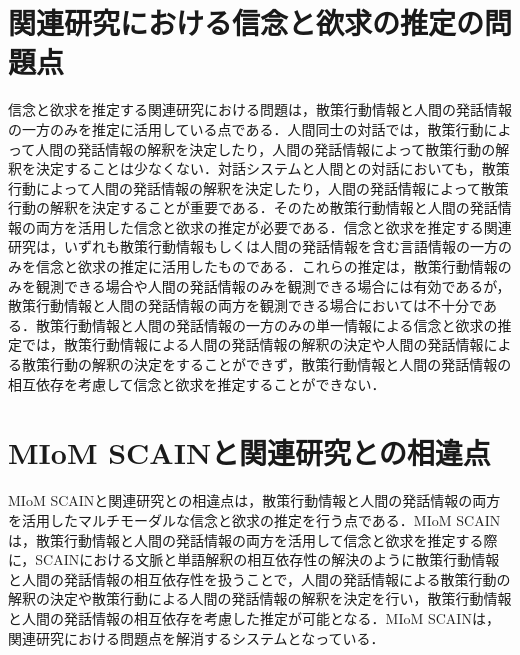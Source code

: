 \section{関連研究における信念と欲求の推定の問題点}
\par
信念と欲求を推定する関連研究における問題は，散策行動情報と人間の発話情報の一方のみを推定に活用している点である．人間同士の対話では，散策行動によって人間の発話情報の解釈を決定したり，人間の発話情報によって散策行動の解釈を決定することは少なくない．対話システムと人間との対話においても，散策行動によって人間の発話情報の解釈を決定したり，人間の発話情報によって散策行動の解釈を決定することが重要である．そのため散策行動情報と人間の発話情報の両方を活用した信念と欲求の推定が必要である．信念と欲求を推定する関連研究は，いずれも散策行動情報もしくは人間の発話情報を含む言語情報の一方のみを信念と欲求の推定に活用したものである．これらの推定は，散策行動情報のみを観測できる場合や人間の発話情報のみを観測できる場合には有効であるが，散策行動情報と人間の発話情報の両方を観測できる場合においては不十分である．散策行動情報と人間の発話情報の一方のみの単一情報による信念と欲求の推定では，散策行動情報による人間の発話情報の解釈の決定や人間の発話情報による散策行動の解釈の決定をすることができず，散策行動情報と人間の発話情報の相互依存を考慮して信念と欲求を推定することができない．


\section{MIoM SCAINと関連研究との相違点}
\par
MIoM SCAINと関連研究との相違点は，散策行動情報と人間の発話情報の両方を活用したマルチモーダルな信念と欲求の推定を行う点である．MIoM SCAINは，散策行動情報と人間の発話情報の両方を活用して信念と欲求を推定する際に，SCAINにおける文脈と単語解釈の相互依存性の解決のように散策行動情報と人間の発話情報の相互依存性を扱うことで，人間の発話情報による散策行動の解釈の決定や散策行動による人間の発話情報の解釈を決定を行い，散策行動情報と人間の発話情報の相互依存を考慮した推定が可能となる．MIoM SCAINは，関連研究における問題点を解消するシステムとなっている．
